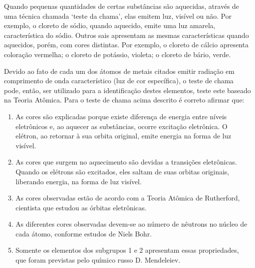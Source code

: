  Quando pequenas quantidades de certas substâncias são aquecidas, através de uma técnica chamada ‘teste da chama’, elas emitem luz, visível ou não. Por exemplo, o cloreto de sódio, quando aquecido, emite uma luz amarela, característica do sódio. Outros sais apresentam as mesmas características quando aquecidos, porém, com cores distintas. Por exemplo, o cloreto de cálcio apresenta coloração vermelha; o cloreto de potássio, violeta; o cloreto de bário, verde.

Devido ao fato de cada um dos átomos de metais citados emitir radiação em comprimento de onda característico (luz de cor específica), o teste de chama pode, então, ser utilizado para a identificação destes elementos, teste este baseado na Teoria Atômica.
Para o teste de chama acima descrito é correto afirmar que:

 \begin{enumerate}[label = (\alph*)]
	\item As cores são explicadas porque existe diferença de energia entre níveis eletrônicos e, ao aquecer as substâncias, ocorre excitação eletrônica. O elétron, ao retornar à sua orbita original, emite energia na forma de luz visível. 
	\item As cores que surgem no aquecimento são devidas a transições eletrônicas. Quando os elétrons são excitados, eles saltam de suas orbitas originais, liberando energia, na forma de luz visível. 
	\item As cores observadas estão de acordo com a Teoria Atômica de Rutherford, cientista que estudou as órbitas eletrônicas. 
	\item As diferentes cores observadas devem-se ao número de nêutrons no núcleo de cada átomo, conforme estudos de Niels Bohr. 
	\item Somente os elementos dos subgrupos 1 e 2 apresentam essas propriedades, que foram previstas pelo químico russo D. Mendeleiev.  
\end{enumerate}
